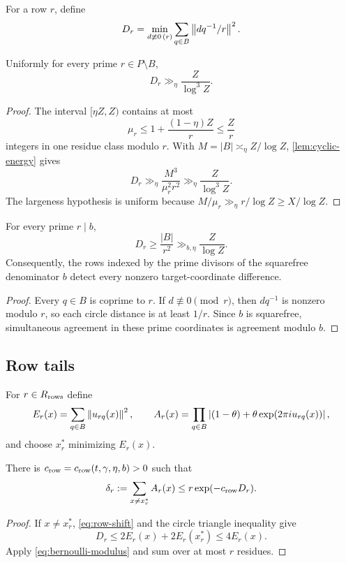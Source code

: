 For a row $r$, define
\[
 D_r=\min_{d\not\equiv0\,(r)}\sum_{q\in B}\left\lVert dq^{-1}/r\right\rVert^2.
\]

\begin{proposition}
\label{prop:lower-row-distance}
Uniformly for every prime $r\in P\setminus B$,
\[
 D_r\gg_\eta\frac{Z}{\log^3Z}.
\]
\end{proposition}
\begin{proof}
The interval $[\eta Z,Z)$ contains at most
\[
 \mu_r\leq1+\frac{(1-\eta)Z}{r}\leq\frac{Z}{r}
\]
integers in one residue class modulo $r$. With $M=|B|\asymp_\eta Z/\log Z$, \cref{lem:cyclic-energy} gives
\[
 D_r\gg_\eta\frac{M^3}{\mu_r^2r^2}\gg_\eta\frac{Z}{\log^3Z}.
\]
The largeness hypothesis is uniform because $M/\mu_r\gg_\eta r/\log Z\geq X/\log Z$.
\end{proof}

\begin{proposition}
\label{prop:target-row-distance}
For every prime $r\mid b$,
\[
 D_r\geq\frac{|B|}{r^2}\gg_{b,\eta}\frac{Z}{\log Z}.
\]
Consequently, the rows indexed by the prime divisors of the squarefree denominator $b$ detect every nonzero target-coordinate difference.
\end{proposition}
\begin{proof}
Every $q\in B$ is coprime to $r$. If $d\not\equiv0\pmod r$, then $dq^{-1}$ is nonzero modulo $r$, so each circle distance is at least $1/r$. Since $b$ is squarefree, simultaneous agreement in these prime coordinates is agreement modulo $b$.
\end{proof}

\subsection{Row tails}

For $r\in R_{\rm rows}$ define
\[
 E_r(x)=\sum_{q\in B}\left\lVert u_{rq}(x)\right\rVert^2,
 \qquad
 A_r(x)=\prod_{q\in B}\left|(1-\theta)+\theta\exp(2\pi i u_{rq}(x))\right|,
\]
and choose $x_r^*$ minimizing $E_r(x)$.

\begin{lemma}
\label{lem:row-tail}
There is $c_{\rm row}=c_{\rm row}(t,\gamma,\eta,b)>0$ such that
\[
 \delta_r:=\sum_{x\neq x_r^*}A_r(x)\leq r\exp(-c_{\rm row}D_r).
\]
\end{lemma}
\begin{proof}
If $x\neq x_r^*$, \cref{eq:row-shift} and the circle triangle inequality give
\[
 D_r\leq2E_r(x)+2E_r(x_r^*)\leq4E_r(x).
\]
Apply \cref{eq:bernoulli-modulus} and sum over at most $r$ residues.
\end{proof}


